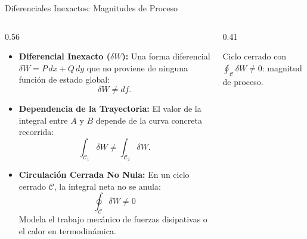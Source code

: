 \documentclass[10pt,aspectratio=169]{beamer}
\begin{document}
\begin{frame}{Diferenciales Inexactos: Magnitudes de Proceso}
  \begin{columns}[c]
    \begin{column}{0.56\textwidth}
      \footnotesize
      \begin{itemize}\itemsep2pt
        \item \textbf{Diferencial Inexacto ($\delta W$):}
        Una forma diferencial $\delta W = P\,dx + Q\,dy$ que no proviene de ninguna función de estado global:
        \[
        \delta W \neq df.
        \]
        \item \textbf{Dependencia de la Trayectoria:}
        El valor de la integral entre $A$ y $B$ depende de la curva concreta recorrida:
        \[
        \int_{\mathcal{C}_1} \delta W \neq \int_{\mathcal{C}_2} \delta W.
        \]
        \item \textbf{Circulación Cerrada No Nula:}
        En un ciclo cerrado $\mathcal{C}$, la integral neta no se anula:
        \[
        \boxed{\oint_\mathcal{C} \delta W \neq 0}
        \]
        Modela el trabajo mecánico de fuerzas disipativas o el calor en termodinámica.
      \end{itemize}
    \end{column}
    \begin{column}{0.41\textwidth}
      \centering
      \vspace{0.1cm}
      {\scriptsize Ciclo cerrado con $\oint_\mathcal{C} \delta W \neq 0$: magnitud de proceso.}
    \end{column}
  \end{columns}
\end{frame}
\end{document}
